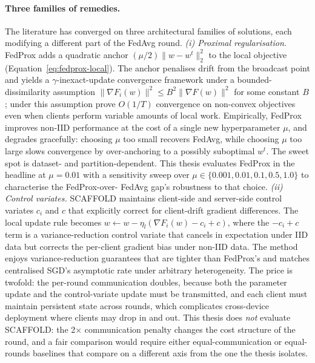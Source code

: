 \documentclass[11pt,a4paper]{article}
\begin{document}
\paragraph{Three families of remedies.}
The literature has converged on three architectural families of solutions,
each modifying a different part of the FedAvg round.
\emph{(i) Proximal regularisation.} FedProx \citep{li2020fedprox} adds a
quadratic anchor $(\mu/2)\lVert w - w^t\rVert_2^2$ to the local objective
(Equation~\ref{eq:fedprox-local}). The anchor penalises drift from the
broadcast point and yields a $\gamma$-inexact-update convergence framework
under a bounded-dissimilarity assumption
$\lVert \nabla F_i(w) \rVert^2 \le B^2 \lVert \nabla F(w) \rVert^2$ for some
constant $B$; under this assumption \citet{li2020fedprox} prove $O(1/T)$
convergence on non-convex objectives even when clients perform variable
amounts of local work. Empirically, FedProx improves non-IID performance at
the cost of a single new hyperparameter $\mu$, and degrades gracefully:
choosing $\mu$ too small recovers FedAvg, while choosing $\mu$ too large
slows convergence by over-anchoring to a possibly suboptimal $w^t$. The
sweet spot is dataset- and partition-dependent. This thesis evaluates FedProx
in the headline at $\mu = 0.01$ with a sensitivity sweep over
$\mu \in \{0.001, 0.01, 0.1, 0.5, 1.0\}$ to characterise the FedProx-over-
FedAvg gap's robustness to that choice.
\emph{(ii) Control variates.} SCAFFOLD \citep{karimireddy2020scaffold}
maintains client-side and server-side control variates $c_i$ and $c$ that
explicitly correct for client-drift gradient differences. The local update
rule becomes $w \leftarrow w - \eta_l (\nabla F_i(w) - c_i + c)$, where the
$-c_i + c$ term is a variance-reduction control variate that cancels in
expectation under IID data but corrects the per-client gradient bias under
non-IID data. The method enjoys variance-reduction guarantees that are
tighter than FedProx's and matches centralised SGD's asymptotic rate under
arbitrary heterogeneity. The price is twofold: the per-round communication
doubles, because both the parameter update and the control-variate update
must be transmitted, and each client must maintain persistent state across
rounds, which complicates cross-device deployment where clients may drop in
and out. This thesis does \emph{not} evaluate SCAFFOLD: the 2$\times$
communication penalty changes the cost structure of the round, and a fair
comparison would require either equal-communication or equal-rounds
baselines that compare on a different axis from the one the thesis isolates.
\end{document}
